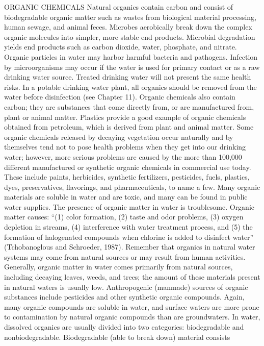 \documentclass{article}
\begin{document}
ORGANIC CHEMICALS Natural organics contain carbon and consist of
biodegradable organic matter such as wastes from biological material
processing, human sewage, and animal feces. Microbes aerobically break
down the complex organic molecules into simpler, more stable end
products. Microbial degradation yields end products such as carbon
dioxide, water, phosphate, and nitrate. Organic particles in water may
harbor harmful bacteria and pathogens. Infection by microorganisms may
occur if the water is used for primary contact or as a raw drinking
water source. Treated drinking water will not present the same health
risks. In a potable drinking water plant, all organics should be removed
from the water before disinfection (see Chapter 11). Organic chemicals
also contain carbon; they are substances that come directly from, or are
manufactured from, plant or animal matter. Plastics provide a good
example of organic chemicals obtained from petroleum, which is derived
from plant and animal matter. Some organic chemicals released by
decaying vegetation occur naturally and by themselves tend not to pose
health problems when they get into our drinking water; however, more
serious problems are caused by the more than 100,000 different
manufactured or synthetic organic chemicals in commercial use today.
These include paints, herbicides, synthetic fertilizers, pesticides,
fuels, plastics, dyes, preservatives, flavorings, and pharmaceuticals,
to name a few. Many organic materials are soluble in water and are
toxic, and many can be found in public water supplies. The presence of
organic matter in water is troublesome. Organic matter causes: ``(1)
color formation, (2) taste and odor problems, (3) oxygen depletion in
streams, (4) interference with water treatment process, and (5) the
formation of halogenated compounds when chlorine is added to disinfect
water'' (Tchobanoglous and Schroeder, 1987). Remember that organics in
natural water systems may come from natural sources or may result from
human activities. Generally, organic matter in water comes primarily
from natural sources, including decaying leaves, weeds, and trees; the
amount of these materials present in natural waters is usually low.
Anthropogenic (manmade) sources of organic substances include pesticides
and other synthetic organic compounds. Again, many organic compounds are
soluble in water, and surface waters are more prone to contamination by
natural organic compounds than are groundwaters. In water, dissolved
organics are usually divided into two categories: biodegradable and
nonbiodegradable. Biodegradable (able to break down) material consists
\end{document}
